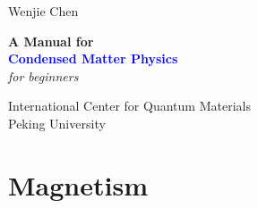 \documentclass[11pt]{book} %
\begin{document}

\begin{titlepage} %

	\raggedleft %
	
	\vspace*{\baselineskip} %
	
	
	{\Large Wenjie Chen} %
	
	\vspace*{0.167\textheight} %
	
	
	\textbf{\LARGE A Manual for}\\[\baselineskip] %
	
	\textbf{\textcolor{Blue}{\Huge Condensed Matter Physics}}\\[\baselineskip] %
	
	{\Large \textit{for beginners}} %
	
	\vfill %
	
	
	{\large International Center for Quantum Materials\\Peking University} %
	
	\vspace*{2\baselineskip} %

\end{titlepage}

\tableofcontents

\chapter{Magnetism}

\begin{center}
\end{center}
\end{document}
